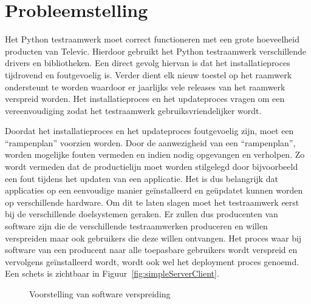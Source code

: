 \section{Probleemstelling}\label{sec:probleem}
Het Python testraamwerk moet correct functioneren met een grote hoeveelheid producten van Televic.
Hierdoor gebruikt het Python testraamwerk verschillende drivers en bibliotheken.
Een direct gevolg hiervan is dat het installatieproces tijdrovend en foutgevoelig is.
Verder dient elk nieuw toestel op het raamwerk ondersteunt te worden waardoor er jaarlijks vele releases van het raamwerk verspreid worden.
Het installatieproces en het updateproces vragen om een vereenvoudiging zodat het testraamwerk gebruiksvriendelijker wordt.

Doordat het installatieproces en het updateproces foutgevoelig zijn, moet een ``rampenplan'' voorzien worden.
Door de aanwezigheid van een ``rampenplan'', worden mogelijke fouten vermeden en indien nodig opgevangen en verholpen.
Zo wordt vermeden dat de productielijn moet worden stilgelegd door bijvoorbeeld een fout tijdens het updaten van een applicatie.
Het is dus belangrijk dat applicaties op een eenvoudige manier geïnstalleerd en geüpdatet kunnen worden op verschillende hardware.
Om dit te laten slagen moet het testraamwerk eerst bij de verschillende doelsystemen geraken.
Er zullen dus producenten van software zijn die de verschillende testraamwerken produceren en willen verspreiden maar ook gebruikers die deze willen ontvangen.
Het proces waar bij software van een producent naar alle toepasbare gebruikers wordt verspreid en vervolgens geïnstalleerd wordt, wordt ook wel het deployment proces genoemd.
Een schets is zichtbaar in Figuur~\vref{fig:simpleServerClient}.

\begin{figure}[!ht]
\centering
{}
\caption{Voorstelling van software verspreiding}
\label{fig:simpleServerClient}
\end{figure}


